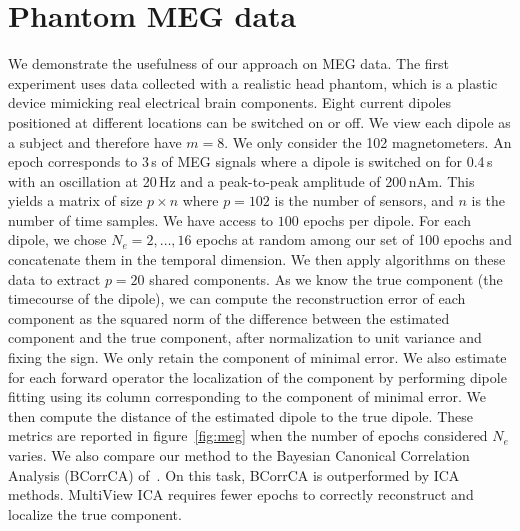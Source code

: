 \section{Phantom MEG data}
\label{sec:mvica:phantom}
We demonstrate the usefulness of our approach on MEG data.
%
The first experiment uses data collected with a realistic head phantom, which is a plastic device mimicking real electrical brain components.
%
Eight current dipoles positioned at different locations can be switched on or off.
%
We view each dipole as a subject and therefore have $m=8$.
%
We only consider the 102 magnetometers.
%
An epoch corresponds to 3\,s of MEG signals where a dipole is switched on for 0.4\,s with an oscillation at 20\,Hz and a peak-to-peak amplitude of 200\,nAm.
%
This yields a matrix of size $p\times n$ where $p=102$ is the number of sensors, and $n$ is the number of time samples.
%
We have access to $100$ epochs per dipole.
%
For each dipole, we chose $N_e=2, \dots, 16$ epochs at random among our set of 100 epochs and concatenate them in the temporal dimension.
%
We then apply algorithms on these data to extract $p=20$ shared components.
%
As we know the true component (the timecourse of the dipole), we can compute the reconstruction error of each component as the squared norm of the difference between the estimated component and the true component, after normalization to unit variance and fixing the sign.
%
We only retain the component of minimal error.
%
We also estimate for each forward operator the localization of the component by performing dipole fitting using its column corresponding to the component of minimal error.
%
We then compute the distance of the estimated dipole to the true dipole.
%
These metrics are reported in figure~\ref{fig:meg} when the number of epochs considered $N_e$ varies.
%
We also compare our method to the Bayesian Canonical Correlation Analysis (BCorrCA) of~\cite{kamronn2015multiview}.
%
On this task, BCorrCA is outperformed by ICA methods.
%
MultiView ICA requires fewer epochs to correctly reconstruct and localize the true component.
%

